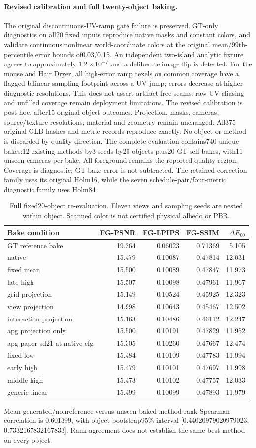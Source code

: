 \paragraph{Revised calibration and full twenty-object baking.}
The original discontinuous-UV-ramp gate failure is preserved. GT-only diagnostics on all20 fixed inputs reproduce native masks and constant colors, and validate continuous nonlinear world-coordinate colors at the original mean/99th-percentile error bounds of0.03/0.15. An independent two-island analytic fixture agrees to approximately $1.2\times10^{-7}$ and a deliberate image flip is detected. For the mouse and Hair Dryer, all high-error ramp texels on common coverage have a flagged bilinear sampling footprint across a UV jump; errors decrease at higher diagnostic resolutions. This does not assert artifact-free seams: raw UV aliasing and unfilled coverage remain deployment limitations. The revised calibration is post hoc, after15 original object outcomes. Projection, masks, cameras, source/texture resolutions, material and geometry remain unchanged. All375 original GLB hashes and metric records reproduce exactly. No object or method is discarded by quality direction.
The complete evaluation contains740 unique bakes:12 existing methods by3 seeds by20 objects plus20 GT self-bakes, with11 unseen cameras per bake. All foreground remains the reported quality region. Coverage is diagnostic; GT-bake error is not subtracted. The retained correction family uses its original Holm16, while the seven schedule-pair/four-metric diagnostic family uses Holm84.
\begin{table}[ht]\centering\scriptsize\begin{tabular}{lrrrr}\toprule Bake condition & FG-PSNR & FG-LPIPS & FG-SSIM & $\Delta E_{00}$ \\\midrule
GT reference bake & 19.364 & 0.06023 & 0.71369 & 5.105 \\
native & 15.479 & 0.10087 & 0.47814 & 12.031 \\
fixed mean & 15.500 & 0.10089 & 0.47847 & 11.973 \\
late high & 15.507 & 0.10098 & 0.47961 & 11.967 \\
grid projection & 15.149 & 0.10524 & 0.45925 & 12.323 \\
view projection & 14.998 & 0.10643 & 0.45467 & 12.502 \\
interaction projection & 15.163 & 0.10486 & 0.46112 & 12.247 \\
apg projection only & 15.500 & 0.10191 & 0.47829 & 11.952 \\
apg paper sd21 at native cfg & 15.305 & 0.10260 & 0.47667 & 12.474 \\
fixed low & 15.484 & 0.10109 & 0.47783 & 11.994 \\
early high & 15.479 & 0.10101 & 0.47697 & 11.998 \\
middle high & 15.473 & 0.10102 & 0.47757 & 12.033 \\
generic linear & 15.499 & 0.10099 & 0.47893 & 11.979 \\
\bottomrule\end{tabular}\caption{Full fixed20-object re-evaluation. Eleven views and sampling seeds are nested within object. Scanned color is not certified physical albedo or PBR.}\end{table}
Mean generated/nonreference versus unseen-baked method-rank Spearman correlation is 0.601399, with object-bootstrap95\% interval [0.44020979020979023, 0.7332167832167833]. Rank agreement does not establish the same best method on every object.

